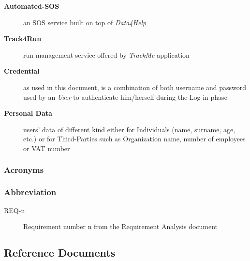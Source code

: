 \documentclass[a4paper]{article}
\begin{document}
\begin{description}
                    \item[\textbf{Automated-SOS}] an SOS service built on top of \textit{Data4Help}
                    
                    \item[\textbf{Track4Run}] run management service offered by \textit{TrackMe} application
                    
                    \item[\textbf{Credential}] as used in this document, is a combination of both username and password used by an \textit{User} to authenticate him/herself during the Log-in phase
                    
                    \item[\textbf{Personal Data}] users' data of different kind either for Individuals (name, surname, age, etc.) or for Third-Parties such as Organization name, number of employees or VAT number
                \end{description}
            
            \subsubsection{Acronyms}
            \begin{acronym}
            \end{acronym}
            
            \subsubsection{Abbreviation}
            \begin{description}
                \item[REQ-n] Requirement number n from the Requirement Analysis document
            \end{description}
            
\subsection{Reference Documents}
\printbibliography[heading=none]
\end{document}
